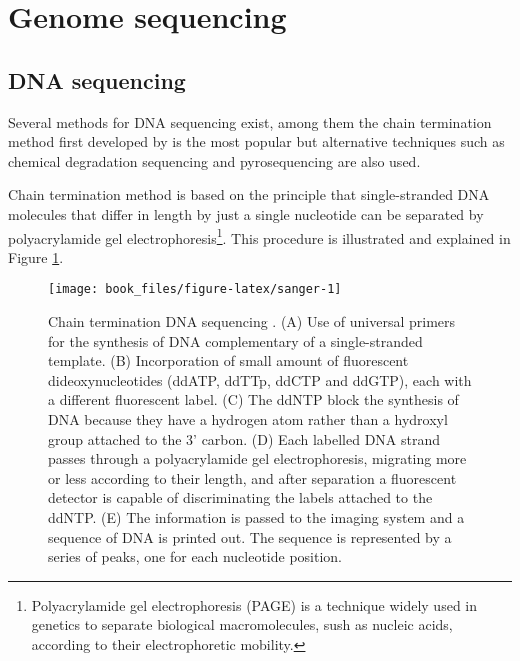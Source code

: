 \documentclass[]{book}
\begin{document}
\hypertarget{genome-sequencing}{%
\section{Genome sequencing}\label{genome-sequencing}}

\hypertarget{DNAseq}{%
\subsection{DNA sequencing}\label{DNAseq}}

Several methods for DNA sequencing exist, among them the chain
termination method first developed by \citep{sanger1977dna} is the most
popular but alternative techniques such as chemical degradation
sequencing \citep{maxam1977new} and pyrosequencing \citep{nyren1993solid} are also
used.

Chain termination method is based on the principle that single-stranded
DNA molecules that differ in length by just a single nucleotide can be
separated by polyacrylamide gel electrophoresis\footnote{Polyacrylamide gel electrophoresis (PAGE) is a technique widely
  used in genetics to separate biological macromolecules, sush as
  nucleic acids, according to their electrophoretic mobility.}. This procedure is
illustrated and explained in Figure \ref{fig:sanger}.



\begin{figure}

{\centering \texttt{[image: book\_files/figure-latex/sanger-1]} 

}

\caption{Chain termination DNA sequencing \citep{brown2007genomes}. (A) Use of universal primers for the synthesis of DNA complementary of a single-stranded template. (B) Incorporation of small amount of fluorescent dideoxynucleotides (ddATP, ddTTp, ddCTP and ddGTP), each with a different fluorescent label. (C) The ddNTP block the synthesis of DNA because they have a hydrogen atom rather than a hydroxyl group attached to the 3' carbon. (D) Each labelled DNA strand passes through a polyacrylamide gel electrophoresis, migrating more or less according to their length, and after separation a fluorescent detector is capable of discriminating the labels attached to the ddNTP. (E) The information is passed to the imaging system and a sequence of DNA is printed out. The sequence is represented by a series of peaks, one for each nucleotide position.}\label{fig:sanger}
\end{figure}
\end{document}

